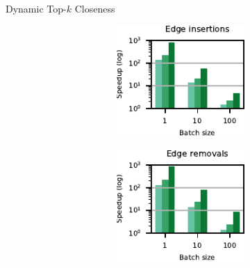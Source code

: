\documentclass[10pt,titlepage,english,presentation]{beamer}
\begin{document}
\begin{frame}[t]{Dynamic Top-$k$ Closeness}
\begin{figure}
\begin{subfigure}[t]{\textwidth}
\begin{subfigure}[t]{.5\textwidth}
\caption*{\scriptsize Complex networks}
\begin{subfigure}[t]{.5\textwidth}
\centering
\includegraphics[width=.9\textwidth]{../sources/plots/dyn-topk/speedup-undirected-small-diameter-addition.pdf}
\end{subfigure}\hfill
\begin{subfigure}[t]{.5\textwidth}
\centering
\includegraphics[width=.9\textwidth]{../sources/plots/dyn-topk/speedup-undirected-small-diameter-removal.pdf}
\end{subfigure}

\end{subfigure}
\end{subfigure}
\end{figure}
\end{frame}
\end{document}
